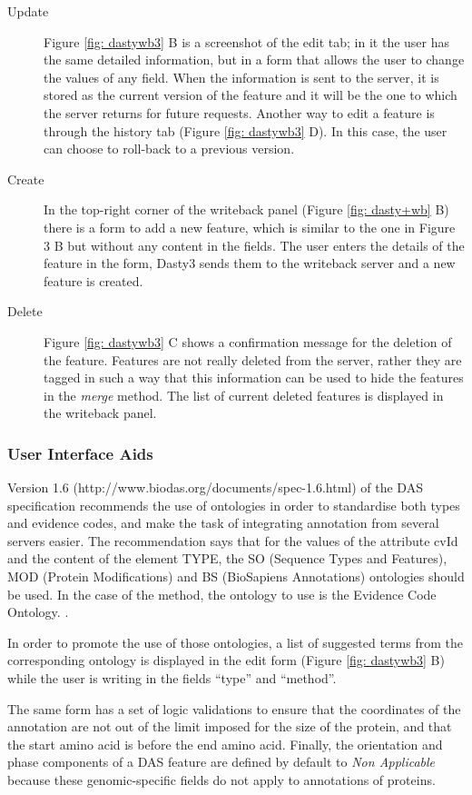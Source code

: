 \begin{description}
	\item[Update] Figure \ref{fig: dastywb3} B is a screenshot of the edit tab; in it the user has the same detailed information, but in a form that allows the user to change the values of any field. When the information is sent to the server, it is stored as the current version of the feature and it will be the one to which the server returns for future requests. Another way to edit a feature is through the history tab (Figure \ref{fig: dastywb3} D). In this case, the user can choose to roll-back to a previous version.
	\item[Create] In the top-right corner of the writeback panel (Figure \ref{fig: dasty+wb} B) there is a form to add a new feature, which is similar to the one in Figure 3 B but without any content in the fields. The user enters the details of the feature in the form, Dasty3 sends them to the writeback server and a new feature is created.
	\item[Delete] Figure \ref{fig: dastywb3} C shows a confirmation message for the deletion of the feature. Features are not really deleted from the server, rather they are tagged in such a way that this information can be used to hide the features in the \emph{merge} method. The list of current deleted features is displayed in the writeback panel.
\end{description}

\subsubsection{User Interface Aids}
Version 1.6 (http://www.biodas.org/documents/spec-1.6.html) of the DAS specification recommends the use of ontologies in order to standardise both types and evidence codes, and make the task of integrating annotation from several servers easier. The recommendation says that for the values of the attribute cvId and the content of the element TYPE, the SO (Sequence Types and Features), MOD (Protein Modifications) and BS (BioSapiens Annotations) ontologies should be used. In the case of the method, the ontology to use is the Evidence Code Ontology. \cite{JEN2008}.

In order to promote the use of those ontologies, a list of suggested terms from the corresponding ontology is displayed in the edit form (Figure \ref{fig: dastywb3} B) while the user is writing in the fields ``type'' and ``method''.

The same form has a set of logic validations to ensure that the coordinates of the annotation are not out of the limit imposed for the size of the protein, and that the start amino acid is before the end amino acid. Finally, the orientation and phase components of a DAS feature are defined by default to \emph{Non Applicable} because these genomic-specific fields do not apply to annotations of proteins.

